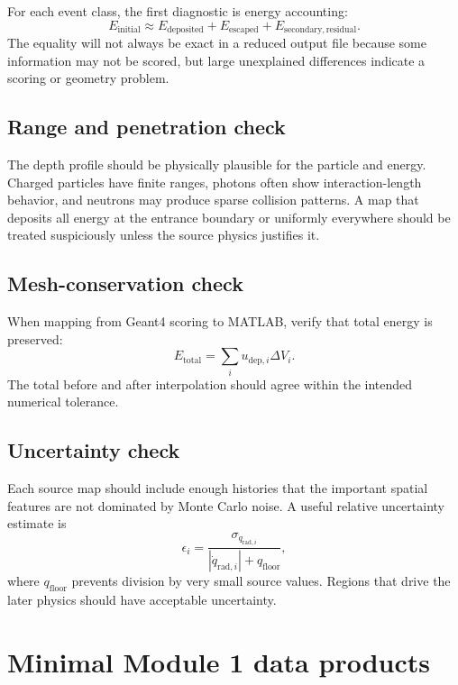 \documentclass[11pt]{article}
\begin{document}
For each event class, the first diagnostic is energy accounting:
\begin{equation}
E_{\mathrm{initial}}
\approx
E_{\mathrm{deposited}}+E_{\mathrm{escaped}}+E_{\mathrm{secondary,residual}}.
\end{equation}
The equality will not always be exact in a reduced output file because some information may not be scored, but large unexplained differences indicate a scoring or geometry problem.

\subsection{Range and penetration check}

The depth profile should be physically plausible for the particle and energy. Charged particles have finite ranges, photons often show interaction-length behavior, and neutrons may produce sparse collision patterns. A map that deposits all energy at the entrance boundary or uniformly everywhere should be treated suspiciously unless the source physics justifies it.

\subsection{Mesh-conservation check}

When mapping from Geant4 scoring to MATLAB, verify that total energy is preserved:
\begin{equation}
E_{\mathrm{total}}
=
\sum_i u_{\mathrm{dep},i}\Delta V_i.
\end{equation}
The total before and after interpolation should agree within the intended numerical tolerance.

\subsection{Uncertainty check}

Each source map should include enough histories that the important spatial features are not dominated by Monte Carlo noise. A useful relative uncertainty estimate is
\begin{equation}
\epsilon_i = \frac{\sigma_{\dot{q}_{\mathrm{rad},i}}}{|\dot{q}_{\mathrm{rad},i}|+q_{\mathrm{floor}}},
\end{equation}
where $q_{\mathrm{floor}}$ prevents division by very small source values. Regions that drive the later physics should have acceptable uncertainty.

\section{Minimal Module 1 data products}
\end{document}
